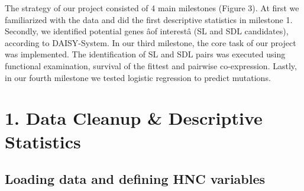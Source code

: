 \documentclass[]{article}
\begin{document}
The strategy of our project consisted of 4 main milestones (Figure 3).
At first we familiarized with the data and did the first descriptive
statistics in milestone 1. Secondly, we identified potential genes âof
interestâ (SL and SDL candidates), according to DAISY-System. In our
third milestone, the core task of our project was implemented. The
identification of SL and SDL pairs was executed using functional
examination, survival of the fittest and pairwise co-expression. Lastly,
in our fourth milestone we tested logistic regression to predict
mutations.

\section{1. Data Cleanup \& Descriptive
Statistics}\label{data-cleanup-descriptive-statistics}

\subsection{Loading data and defining HNC
variables}\label{loading-data-and-defining-hnc-variables}
\end{document}
